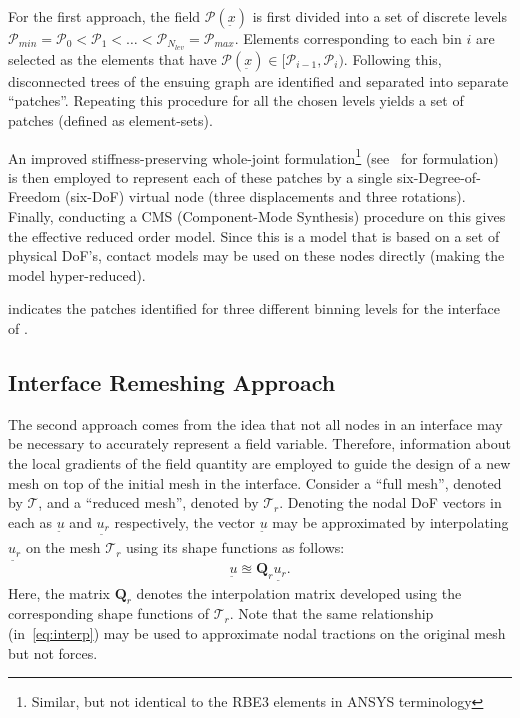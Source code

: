 \documentclass[10pt,print]{article}
\newcommand{\utilde}[1]{\underset{\widetilde{}}{#1}}
\begin{document}
For the first approach, the field $\mathcal{P}(\utilde{x})$ is first
divided into a set of discrete levels $\mathcal{P}_{min} =
\mathcal{P}_0<\mathcal{P}_1<\dots<\mathcal{P}_{N_{lev}}=\mathcal{P}_{max}$. Elements
corresponding to each bin $i$ are selected as the elements that have
$\mathcal{P}(\utilde{x})\in[\mathcal{P}_{i-1},
\mathcal{P}_i)$. Following this, disconnected trees of the ensuing
graph are identified and separated into separate
``patches''. Repeating this procedure for all the chosen levels yields
a set of patches (defined as element-sets).

An improved stiffness-preserving whole-joint
formulation\footnote{Similar, but not identical to the RBE3 elements
  in ANSYS terminology} (see~\cite{intredpaper} for formulation) is
then employed to represent each of these patches by a single
six-Degree-of-Freedom (six-DoF) virtual node (three displacements and
three rotations). Finally, conducting a CMS (Component-Mode Synthesis)
procedure on this gives the effective reduced order model. Since this
is a model that is based on a set of physical DoF's, contact models
may be used on these nodes directly (making the model
hyper-reduced).

 indicates the patches identified for three different
binning levels for the interface of .

\subsection{Interface Remeshing Approach}
\label{sec:interf-remesh-appr}

The second approach comes from the idea that not all nodes in an
interface may be necessary to accurately represent a field
variable. Therefore, information about the local gradients of the
field quantity are employed to guide the design of a new mesh on top
of the initial mesh in the interface. Consider a ``full mesh'',
  denoted by $\mathcal{T}$, and a ``reduced mesh'', denoted by
  $\mathcal{T}_r$. Denoting the nodal DoF vectors in each as
  $\utilde{u}$ and $\utilde{u_r}$ respectively, the vector
  $\utilde{u}$ may be approximated by interpolating $\utilde{u_r}$ on
  the mesh $\mathcal{T}_r$ using its shape functions as follows:
\begin{equation}
  \utilde{u} \approxeq \mathbf{Q}_r\utilde{u_r}.
  \label{eq:interp}
\end{equation}
Here, the matrix $\mathbf{Q}_r$ denotes the interpolation matrix
developed using the corresponding shape functions of
$\mathcal{T}_r$. Note that the same relationship (in~\cref{eq:interp})
may be used to approximate nodal tractions on the original mesh but
not forces.
\end{document}
